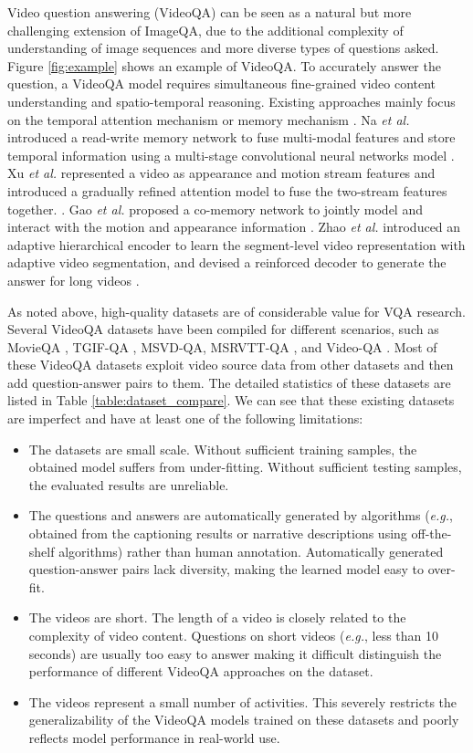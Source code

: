 \documentclass[letterpaper]{article} \usepackage{aaai19}  \usepackage{times}  \usepackage{helvet}  \usepackage{courier}  \usepackage{url}  \usepackage{graphicx}  \usepackage{amsfonts}
\begin{document}
Video question answering (VideoQA) can be seen as a natural but more challenging extension of ImageQA, due to the additional complexity of understanding of image sequences and more diverse types of questions asked. Figure \ref{fig:example} shows an example of VideoQA. To accurately answer the question, a VideoQA model requires simultaneous fine-grained video content understanding and spatio-temporal reasoning. Existing approaches mainly focus on the temporal attention mechanism \cite{jang2017tgif,xu2017video} or memory mechanism \cite{na2017read,kim2017deepstory,zhao2018multi}. Na \emph{et al.} introduced a read-write memory network to fuse multi-modal features and store temporal information using a multi-stage convolutional neural networks model \cite{na2017read}. Xu \emph{et al.} represented a video as appearance and motion stream features and introduced a gradually refined attention model to fuse the two-stream features together. \cite{xu2017video}. Gao \emph{et al.} proposed a co-memory network to jointly model and interact with the motion and appearance information \cite{gao2018motion}. Zhao  \emph{et al.} introduced an adaptive hierarchical encoder to learn the segment-level video representation with adaptive video segmentation, and devised a reinforced decoder to generate the answer for long videos \cite{zhao2018open}.

As noted above, high-quality datasets are of considerable value for VQA research. Several VideoQA datasets have been compiled for different scenarios, such as MovieQA \cite{tapaswi2016movieqa}, TGIF-QA \cite{jang2017tgif}, MSVD-QA, MSRVTT-QA \cite{xu2017video}, and Video-QA \cite{zeng2017leveraging}. Most of these VideoQA datasets exploit video source data from other datasets and then add question-answer pairs to them. The detailed statistics of these datasets are listed in Table \ref{table:dataset_compare}. We can see that these existing datasets are imperfect and have at least one of the following limitations:

 \begin{itemize}
   \item The datasets are small scale. Without sufficient training samples, the obtained model suffers from under-fitting. Without sufficient testing samples, the evaluated results are unreliable.
   \item The questions and answers are automatically generated by algorithms (\emph{e.g.}, obtained from the captioning results or narrative descriptions using off-the-shelf algorithms) rather than human annotation. Automatically generated question-answer pairs lack diversity, making the learned model easy to over-fit.
   \item The videos are short. The length of a video is closely related to the complexity of video content. Questions on short videos (\emph{e.g.}, less than 10 seconds) are usually too easy to answer making it difficult distinguish the performance of different VideoQA approaches on the dataset.
   \item The videos represent a small number of activities. This severely restricts the generalizability of the VideoQA models trained on these datasets and poorly reflects model performance in real-world use.
 \end{itemize}
\end{document}
